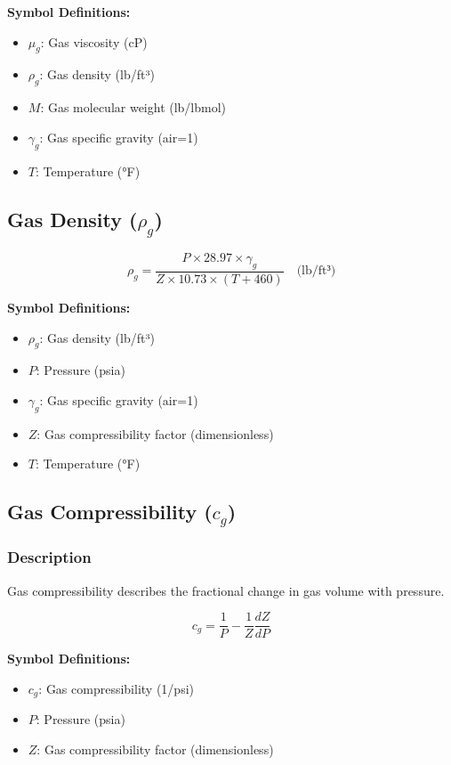 \documentclass[11pt,a4paper]{article}
\newcommand{\symitem}[2]{\item \textbf{#1}: #2}
\begin{document}
\textbf{Symbol Definitions:}
\begin{itemize}[leftmargin=2cm]
\symitem{$\mu_g$}{Gas viscosity (cP)}
\symitem{$\rho_g$}{Gas density (lb/ft³)}
\symitem{$M$}{Gas molecular weight (lb/lbmol)}
\symitem{$\gamma_g$}{Gas specific gravity (air=1)}
\symitem{$T$}{Temperature (°F)}
\end{itemize}

\subsection{Gas Density ($\rho_g$)}

\begin{tcolorbox}[colback=formulabox,colframe=black!75]
\begin{equation}
\rho_g = \frac{P \times 28.97 \times \gamma_g}{Z \times 10.73 \times (T+460)} \quad \text{(lb/ft³)}
\end{equation}
\end{tcolorbox}

\textbf{Symbol Definitions:}
\begin{itemize}[leftmargin=2cm]
\symitem{$\rho_g$}{Gas density (lb/ft³)}
\symitem{$P$}{Pressure (psia)}
\symitem{$\gamma_g$}{Gas specific gravity (air=1)}
\symitem{$Z$}{Gas compressibility factor (dimensionless)}
\symitem{$T$}{Temperature (°F)}
\end{itemize}

\subsection{Gas Compressibility ($c_g$)}

\subsubsection{Description}
Gas compressibility describes the fractional change in gas volume with pressure.

\begin{tcolorbox}[colback=formulabox,colframe=black!75]
\begin{equation}
c_g = \frac{1}{P} - \frac{1}{Z} \frac{dZ}{dP}
\end{equation}
\end{tcolorbox}

\textbf{Symbol Definitions:}
\begin{itemize}[leftmargin=2cm]
\symitem{$c_g$}{Gas compressibility (1/psi)}
\symitem{$P$}{Pressure (psia)}
\symitem{$Z$}{Gas compressibility factor (dimensionless)}
\end{itemize}
\end{document}
